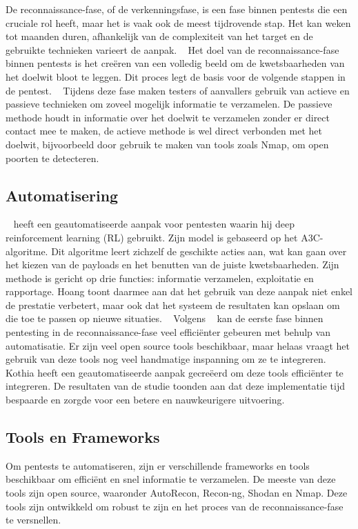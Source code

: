 De reconnaissance-fase, of de verkenningsfase, is een fase binnen pentests die een cruciale rol heeft, maar het is vaak ook de meest tijdrovende stap.
Het kan weken tot maanden duren, afhankelijk van de complexiteit van het target en de gebruikte technieken varieert de aanpak. ~\autocite{Shah} 
Het doel van de reconnaissance-fase binnen pentests is het creëren van een volledig beeld om de 
kwetsbaarheden van het doelwit bloot te leggen. Dit proces legt de basis voor de
volgende stappen in de pentest. ~\autocite{Kothia} 
Tijdens deze fase maken testers of aanvallers gebruik van actieve en passieve technieken om zoveel
mogelijk informatie te verzamelen. De passieve methode houdt in informatie over het doelwit te verzamelen zonder er direct contact mee te maken, 
de actieve methode is wel direct verbonden met het doelwit, bijvoorbeeld door gebruik te maken van tools zoals Nmap, om open poorten te detecteren. ~\autocite{Shah}

\subsection{Automatisering}

~\textcite{Hoang} heeft een geautomatiseerde aanpak voor pentesten waarin hij deep reinforcement 
learning (RL) gebruikt. Zijn model is gebaseerd op het A3C-algoritme. Dit algoritme leert zichzelf de geschikte acties aan, wat kan 
gaan over het kiezen van de payloads en het benutten van de juiste kwetsbaarheden. Zijn methode is gericht op drie functies: informatie verzamelen, 
exploitatie en rapportage. Hoang toont daarmee aan dat het gebruik van deze aanpak niet enkel de prestatie verbetert, maar ook dat het systeem de resultaten 
kan opslaan om die toe te passen op nieuwe situaties. ~\autocite{Hoang}
Volgens ~\textcite{Kothia} kan de eerste fase binnen pentesting in de reconnaissance-fase veel 
efficiënter gebeuren met behulp van automatisatie. Er zijn veel open source tools beschikbaar, maar helaas vraagt het gebruik van deze 
tools nog veel handmatige inspanning om ze te integreren. Kothia heeft een geautomatiseerde aanpak gecreëerd om deze tools
efficiënter te integreren. De resultaten van de studie toonden aan dat deze implementatie tijd 
bespaarde en zorgde voor een betere en nauwkeurigere uitvoering. ~\autocite{Kothia}


\subsection{Tools en Frameworks}
Om pentests te automatiseren, zijn er verschillende frameworks en tools beschikbaar om 
efficiënt en snel informatie te verzamelen. De meeste van deze tools zijn open source, waaronder 
AutoRecon, Recon-ng, Shodan en Nmap. Deze tools zijn ontwikkeld om robust te zijn en het proces van de reconnaissance-fase te versnellen. ~\autocite{Shebli}


